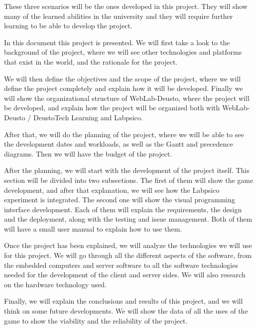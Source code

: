 These three scenarios will be the ones developed in this project. They will show many of the learned
abilities in the university and they will require further learning to be able to develop the
project.

In this document this project is presented. We will first take a look to the background of the
project, where we will see other technologies and platforms that exist in the world, and the
rationale for the project.

We will then define the objectives and the scope of the project, where we will define the project
completely and explain how it will be developed. Finally we will show the organizational structure
of WebLab-Deusto, where the project will be developed, and explain how the project will be organized
both with WebLab-Deusto / DeustoTech Learning and Labpsico.

After that, we will do the planning of the project, where we will be able to see the development
dates and workloads, as well as the Gantt and precedence diagrams. Then we will have the budget of
the project.

After the planning, we will start with the development of the project itself. This section will be
divided into two subsections. The first of them will show the game development, and after that
explanation, we will see how the Labpsico experiment is integrated. The second one will show the
visual programming interface development. Each of them will explain the requirements, the design and
the deployment, along with the testing and issue management. Both of them will have a small user
manual to explain how to use them.

Once the project has been explained, we will analyze the technologies we will use for this project.
We will go through all the different aspects of the software, from the embedded computers and server
software to all the software technologies needed for the development of the client and server sides.
We will also research on the hardware technology used.

Finally, we will explain the conclusions and results of this project, and we will think on some
future developments. We will show the data of all the uses of the game to show the viability and the
reliability of the project.
